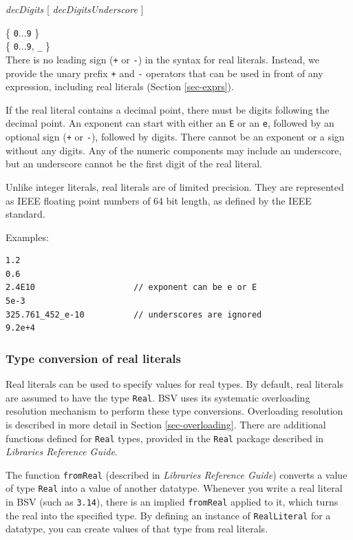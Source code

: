 \documentclass[twoside,letterpaper]{article}
\newcommand{\hm}{\hspace*{1em}}
\newcommand{\LibRefGuide}{\emph{Libraries Reference Guide}}
\newcommand{\BSV}{BSV}
\newcommand{\te}[1]{\texttt{#1}}
\newcommand{\nterm}[1]{\emph{#1}}
\newcommand{\many}[1]{\{ #1 \}}
\newcommand{\opt}[1]{[ #1 ]}
\newcommand{\gram}[2]{    \hm\makebox[10em][l]{\it #1}\makebox[1.5em][l]{::=}    #2}
\begin{document}
\gram{decNum} {\nterm{decDigits} \opt{\nterm{decDigitsUnderscore}}}

\gram{decDigits}{\many{\texttt{0}...\texttt{9}}} \\
\gram{decDigitsUnderscore} {\many{\texttt{0}...\texttt{9}, \te{\_}}}\\


There is no leading sign (\te{+} or \te{-}) in the syntax for real
literals.  Instead, we provide the unary prefix \te{+} and \te{-}
operators that can be used in front of any expression, including real
literals (Section \ref{sec-exprs}).

If the real literal contains a decimal point,  there must be  digits following 
the decimal point.  An exponent can start with  either an \te{E} or
an \te{e}, followed by an optional 
sign (\te{+} or \te{-}), followed by digits.  There cannot be an
exponent or a sign without any digits.  Any of the numeric components
may include an underscore, but an underscore cannot be the first digit
of the real literal.

Unlike integer literals, real literals are of limited precision.  They are
represented as IEEE floating point numbers of 64 bit length, as defined by
the IEEE standard.
 

Examples:
\begin{verbatim}
1.2
0.6
2.4E10                    // exponent can be e or E
5e-3
325.761_452_e-10          // underscores are ignored
9.2e+4
\end{verbatim}


\subsubsection{Type conversion of real literals}

Real literals can be used to specify values for real types.  By
default, real literals are assumed to have the type \te{Real}. {\BSV}
uses its systematic overloading resolution mechanism to perform these
type conversions.  Overloading resolution is described in more detail
in Section {\ref{sec-overloading}}.  There are additional functions
defined for \te{Real} types, provided in the \te{Real} package
described in {\LibRefGuide}.

The function \te{fromReal} (described in {\LibRefGuide}) converts a
value of type \te{Real} into a value of another datatype.  Whenever
you write a real literal in BSV (such as \te{3.14}), there is an
implied \te{fromReal} applied to it, which turns the real into the
specified type.  By defining an instance of \te{RealLiteral} for a
datatype, you can create values of that type from real literals.
\end{document}
